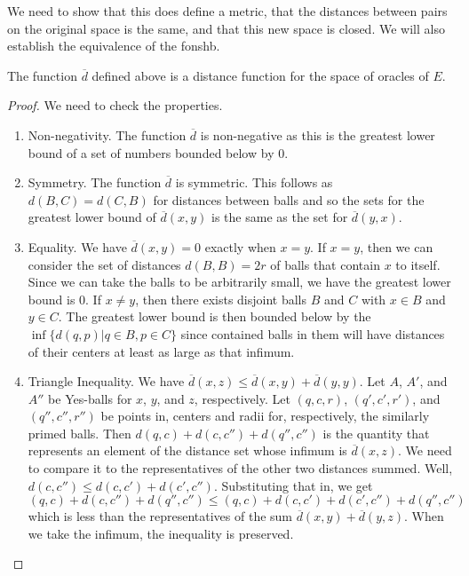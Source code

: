 \documentclass[12pt]{article}
\begin{document}
We need to show that this does define a metric, that the distances between pairs on the original space is the same, and that this new space is closed. We will also establish the equivalence of the fonshb. 

\begin{proposition}
    The function $\overline{d}$ defined above is a distance function for the space of oracles of $E$. 
\end{proposition}

\begin{proof}
We need to check the properties. 
\begin{enumerate}
\item Non-negativity. The function $\overline{d}$ is non-negative as this is the greatest lower bound of a set of numbers bounded below by 0. 
\item Symmetry. The function $\overline{d}$ is symmetric. This follows as $d(B,C) = d(C,B)$ for distances between balls and so the sets for the greatest lower bound of $\overline{d}(x,y)$ is the same as the set for $\overline{d}(y,x)$.
\item Equality. We have $\overline{d}(x,y) = 0$ exactly when $x=y$. If $x=y$, then we can consider the set of distances $d(B,B)= 2r$ of balls that contain $x$ to itself. Since we can take the balls to be arbitrarily small, we have the greatest lower bound is 0. If $x \neq y$, then there exists disjoint balls $B$ and $C$ with $x \in B$ and $y \in C$. The greatest lower bound is then bounded below by the $\inf\{d(q,p) | q \in B, p \in C\}$ since contained balls in them will have distances of their centers at least as large as that infimum. 
\item Triangle Inequality. We have $\overline{d}(x,z) \leq \overline{d}(x,y) + \overline{d}(y,y)$. Let $A$, $A'$, and $A''$ be Yes-balls for $x$, $y$, and $z$, respectively. Let $(q,c, r)$, $(q',c', r')$, and $(q'', c'', r'')$ be points in, centers and radii for, respectively, the similarly primed balls. Then $d(q,c) + d(c, c'') + d(q'',c'')$ is the quantity that represents an element of the distance set whose infimum is $\overline{d}(x,z)$. We need to compare it to the representatives of the other two distances summed. Well, $d(c,c'') \leq d(c,c') + d(c', c'')$. Substituting that in, we get $(q,c) + d(c, c'') + d(q'',c'') \leq (q,c) + d(c,c') + d(c', c'') + d(q'',c'')$ which is less than the representatives of the sum $\overline{d}(x,y) + \overline{d}(y,z)$. When we take the infimum, the inequality is preserved. 
\end{enumerate}
\end{proof}
\end{document}
